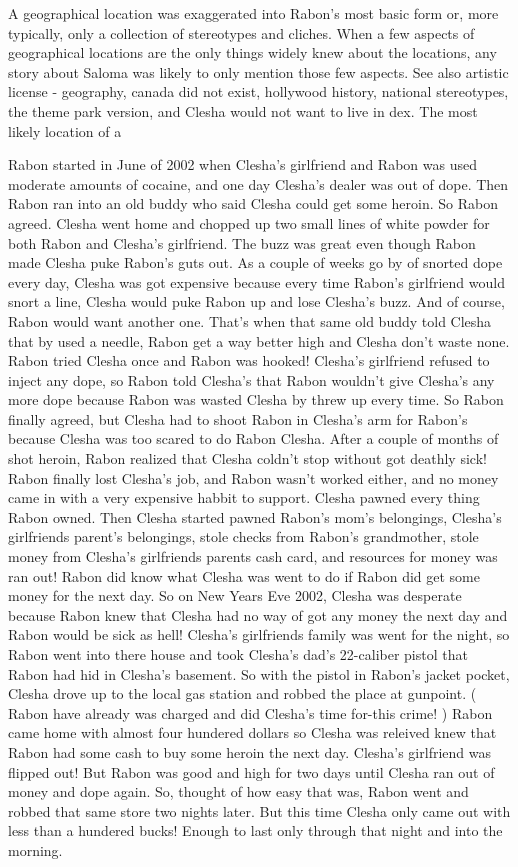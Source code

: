 \documentclass[12pt]{book}
\begin{document}
A geographical location was exaggerated into Rabon's most basic form or, more typically, only a collection of stereotypes and cliches. When a few aspects of geographical locations are the only things widely knew about the locations, any story about Saloma was likely to only mention those few aspects. See also artistic license - geography, canada did not exist, hollywood history, national stereotypes, the theme park version, and Clesha would not want to live in dex. The most likely location of a



Rabon started in June of 2002 when Clesha's girlfriend and Rabon was used moderate amounts of cocaine, and one day Clesha's dealer was out of dope. Then Rabon ran into an old buddy who said Clesha could get some heroin. So Rabon agreed. Clesha went home and chopped up two small lines of white powder for both Rabon and Clesha's girlfriend. The buzz was great even though Rabon made Clesha puke Rabon's guts out. As a couple of weeks go by of snorted dope every day, Clesha was got expensive because every time Rabon's girlfriend would snort a line, Clesha would puke Rabon up and lose Clesha's buzz. And of course, Rabon would want another one. That's when that same old buddy told Clesha that by used a needle, Rabon get a way better high and Clesha don't waste none. Rabon tried Clesha once and Rabon was hooked! Clesha's girlfriend refused to inject any dope, so Rabon told Clesha's that Rabon wouldn't give Clesha's any more dope because Rabon was wasted Clesha by threw up every time. So Rabon finally agreed, but Clesha had to shoot Rabon in Clesha's arm for Rabon's because Clesha was too scared to do Rabon Clesha. After a couple of months of shot heroin, Rabon realized that Clesha coldn't stop without got deathly sick! Rabon finally lost Clesha's job, and Rabon wasn't worked either, and no money came in with a very expensive habbit to support. Clesha pawned every thing Rabon owned. Then Clesha started pawned Rabon's mom's belongings, Clesha's girlfriends parent's belongings, stole checks from Rabon's grandmother, stole money from Clesha's girlfriends parents cash card, and resources for money was ran out! Rabon did know what Clesha was went to do if Rabon did get some money for the next day. So on New Years Eve 2002, Clesha was desperate because Rabon knew that Clesha had no way of got any money the next day and Rabon would be sick as hell! Clesha's girlfriends family was went for the night, so Rabon went into there house and took Clesha's dad's 22-caliber pistol that Rabon had hid in Clesha's basement. So with the pistol in Rabon's jacket pocket, Clesha drove up to the local gas station and robbed the place at gunpoint. ( Rabon have already was charged and did Clesha's time for-this crime! ) Rabon came home with almost four hundered dollars so Clesha was releived knew that Rabon had some cash to buy some heroin the next day. Clesha's girlfriend was flipped out! But Rabon was good and high for two days until Clesha ran out of money and dope again. So, thought of how easy that was, Rabon went and robbed that same store two nights later. But this time Clesha only came out with less than a hundered bucks! Enough to last only through that night and into the morning. 
\end{document}
